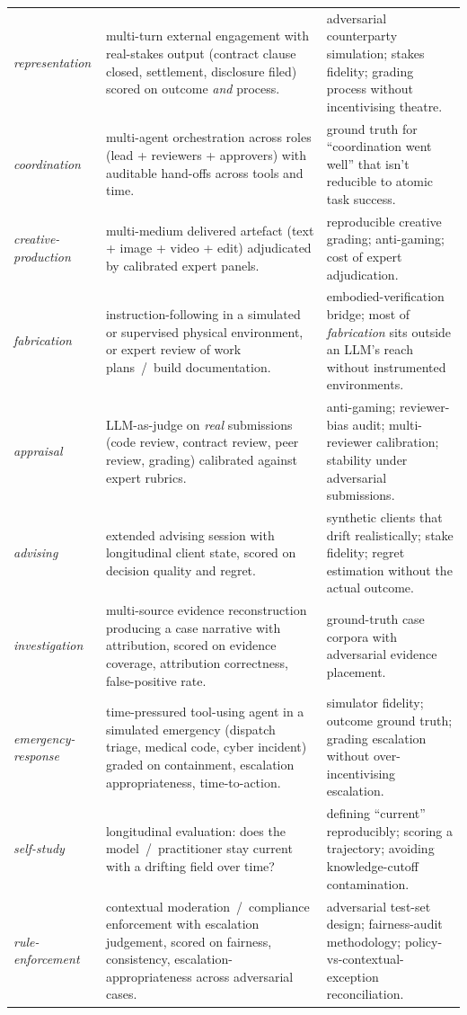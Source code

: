 \documentclass{article}
\begin{document}
\begin{table}[t]
\begin{tabularx}{\linewidth}{lXX}
\emph{representation} & multi-turn external engagement with real-stakes output (contract clause closed, settlement, disclosure filed) scored on outcome \emph{and} process. & adversarial counterparty simulation; stakes fidelity; grading process without incentivising theatre. \\
\emph{coordination} & multi-agent orchestration across roles (lead + reviewers + approvers) with auditable hand-offs across tools and time. & ground truth for ``coordination went well'' that isn't reducible to atomic task success. \\
\emph{creative-production} & multi-medium delivered artefact (text + image + video + edit) adjudicated by calibrated expert panels. & reproducible creative grading; anti-gaming; cost of expert adjudication. \\
\emph{fabrication} & instruction-following in a simulated or supervised physical environment, or expert review of work plans~/~build documentation. & embodied-verification bridge; most of \emph{fabrication} sits outside an LLM's reach without instrumented environments. \\
\emph{appraisal} & LLM-as-judge on \emph{real} submissions (code review, contract review, peer review, grading) calibrated against expert rubrics. & anti-gaming; reviewer-bias audit; multi-reviewer calibration; stability under adversarial submissions. \\
\emph{advising} & extended advising session with longitudinal client state, scored on decision quality and regret. & synthetic clients that drift realistically; stake fidelity; regret estimation without the actual outcome. \\
\emph{investigation} & multi-source evidence reconstruction producing a case narrative with attribution, scored on evidence coverage, attribution correctness, false-positive rate. & ground-truth case corpora with adversarial evidence placement. \\
\emph{emergency-response} & time-pressured tool-using agent in a simulated emergency (dispatch triage, medical code, cyber incident) graded on containment, escalation appropriateness, time-to-action. & simulator fidelity; outcome ground truth; grading escalation without over-incentivising escalation. \\
\emph{self-study} & longitudinal evaluation: does the model~/~practitioner stay current with a drifting field over time? & defining ``current'' reproducibly; scoring a trajectory; avoiding knowledge-cutoff contamination. \\
\emph{rule-enforcement} & contextual moderation~/~compliance enforcement with escalation judgement, scored on fairness, consistency, escalation-appropriateness across adversarial cases. & adversarial test-set design; fairness-audit methodology; policy-vs-contextual-exception reconciliation. \\
\bottomrule
\end{tabularx}
\end{table}
\end{document}
